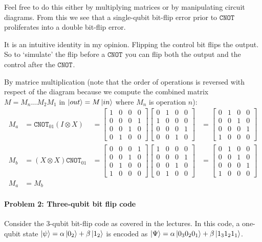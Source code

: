 \documentclass[12pt]{article}
\newcommand{\bmat}[1]{\begin{bmatrix}#1\end{bmatrix}}
\newenvironment{answer}{\begingroup\setlength{\leftskip}{-\leftmargin}\begin{framed}}{\end{framed}\endgroup}
\newcommand{\CNOT}[1]{\ensuremath{\texttt{CNOT}_{#1}}}
\begin{document}
\begin{enumerate}
    Feel free to do this either by multiplying matrices or by manipulating circuit diagrams. From this we see that a single-qubit bit-flip error prior to \CNOT{} proliferates into a double bit-flip error.

    \begin{answer}
        It is an intuitive identity in my opinion. Flipping the control bit flips the output. So to `simulate' the flip before a \CNOT{} you can flip both the output and the control after the \CNOT{}.

        By matrice multiplication (note that the order of operations is reversed with respect of the diagram because we compute the combined matrix $M = M_n\dots{}M_2M_1$ in $\ket{out} = M\ket{in}$ where $M_n$ is operation $n$):
        \begin{align*}
            M_a &= \CNOT{01}(I \otimes X) &=
                \bmat{1&0&0&0\\0&0&0&1\\0&0&1&0\\0&1&0&0}
                \bmat{0&1&0&0\\1&0&0&0\\0&0&0&1\\0&0&1&0} &=
                \bmat{0&1&0&0\\0&0&1&0\\0&0&0&1\\1&0&0&0}\\
            M_b &= (X \otimes X)\CNOT{01} &=
                \bmat{0&0&0&1\\0&0&1&0\\0&1&0&0\\1&0&0&0}
                \bmat{1&0&0&0\\0&0&0&1\\0&0&1&0\\0&1&0&0} &=
                \bmat{0&1&0&0\\0&0&1&0\\0&0&0&1\\1&0&0&0}\\
            M_a &= M_b
        \end{align*}
    \end{answer}
\end{enumerate}

\paragraph{Problem 2: Three-qubit bit flip code} \hfill

Consider the 3-qubit bit-flip code as covered in the lectures. In this code, a one-qubit state $\ket{\psi} = \alpha\ket{0_2} + \beta\ket{1_2}$ is encoded as $\ket{\Psi} = \alpha\ket{0_30_20_1} + \beta\ket{1_31_21_1}$.
\end{document}

